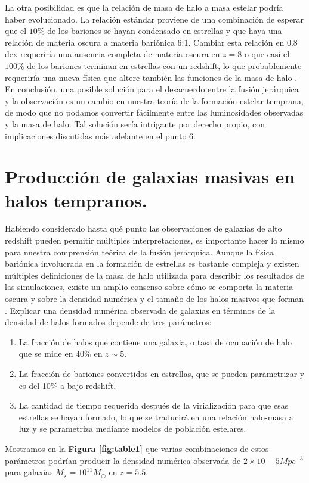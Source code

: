 \documentclass{article}
\begin{document}
La otra posibilidad es que la relación de masa de halo a masa estelar podría haber evolucionado. La relación estándar proviene de una combinación de esperar que el $10\%$ de los bariones se hayan condensado en estrellas y que haya una relación de materia oscura a materia bariónica 6:1. Cambiar esta relación en 0.8 dex requeriría una ausencia completa de materia oscura en $z = 8$ o que casi el $100\%$ de los bariones terminan en estrellas con un redshift, lo que probablemente requeriría una nueva física que altere también las funciones de la masa de halo .\\

En conclusión, una posible solución para el desacuerdo entre la fusión jerárquica y la observación es un cambio en nuestra teoría de la formación estelar temprana, de modo que no podamos convertir fácilmente entre las luminosidades observadas y la masa de halo. Tal solución sería intrigante por derecho propio, con implicaciones discutidas más adelante en el punto 6.

\section{Producción de galaxias masivas en halos tempranos.}
Habiendo considerado hasta qué punto las observaciones de galaxias de alto redshift pueden permitir múltiples interpretaciones, es importante hacer lo mismo para nuestra comprensión teórica de la fusión jerárquica. Aunque la física bariónica involucrada en la formación de estrellas es bastante compleja y existen múltiples definiciones de la masa de halo utilizada para describir los resultados de las simulaciones, existe un amplio consenso sobre cómo se comporta la materia oscura y sobre la densidad numérica y el tamaño de los halos masivos que forman . Explicar una densidad numérica observada de galaxias en términos de la densidad de halos formados depende de tres parámetros: 
\begin{enumerate}
\item La fracción de halos que contiene una galaxia, o tasa de ocupación de halo que se mide en 40\% en $z\sim 5$.
\item La fracción de bariones convertidos en estrellas, que se pueden parametrizar y es del 10\% a bajo redshift. 
\item La cantidad de tiempo requerida después de la virialización para que esas estrellas se hayan formado, lo que se traducirá en una relación halo-masa a luz y se parametriza mediante modelos de población estelares.
\end{enumerate}  
Mostramos en la \textbf{Figura \ref{fig:table1}} que varias combinaciones de estos parámetros podrían producir la densidad numérica observada de $2\times 10-5 Mpc^{-3}$ para galaxias $M_\star = 10^{11}M_\odot$ en $z = 5.5$.
\end{document}
